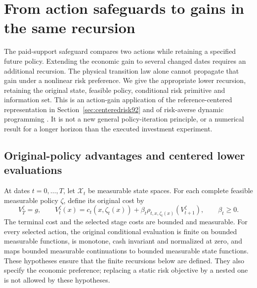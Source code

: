 \section{From action safeguards to gains in the same recursion}
\label{supp:dynamicgain122}

The paid-support safeguard compares two actions while retaining a specified
future policy. Extending the economic gain to several changed dates requires
an additional recursion. The physical transition law alone cannot propagate
that gain under a nonlinear risk preference. We give the appropriate lower
recursion, retaining the original state, feasible policy, conditional risk
primitive and information set. This is an action-gain application of the
reference-centered representation in Section~\ref{sec:centeredrisk92} and of
risk-averse dynamic programming \citep{ruszczynski2010risk,ruszczynski2014erratum}.
It is not a new general policy-iteration principle, or a numerical result for
a longer horizon than the executed investment experiment.

\subsection{Original-policy advantages and centered lower evaluations}

At dates $t=0,\ldots,T$, let $\mathcal X_t$ be measurable state spaces.
For each complete feasible measurable policy $\zeta$, define its original
cost by
\begin{equation}\label{eq:policyrecursion122}
 V_T^\zeta=g,\qquad
 V_t^\zeta(x)=c_t(x,\zeta_t(x))+
       \beta_t\rho_{t,x,\zeta_t(x)}(V_{t+1}^\zeta),
 \qquad \beta_t\ge0.
\end{equation}
The terminal cost and the selected stage costs are bounded and measurable.
For every selected action, the original conditional evaluation is finite on
bounded measurable functions, is monotone, cash invariant and normalized at
zero, and maps bounded measurable continuations to bounded measurable
state functions. These hypotheses ensure that the finite recursions below
are defined. They also specify the economic preference; replacing a static
risk objective by a nested one is not allowed by these hypotheses.


